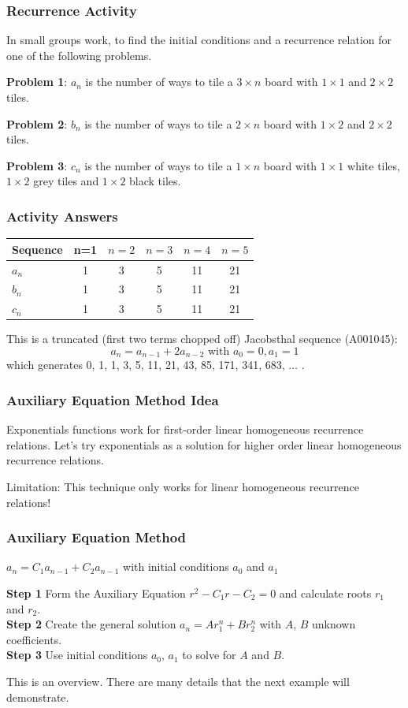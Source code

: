 \documentclass{beamer}
\begin{document}
\frame
{
  \frametitle{Recurrence Activity}

In small groups work, to find the initial conditions and a recurrence relation for one of the following problems.\vfill

{\bf Problem 1}: $a_n$ is the number of ways to tile a $3 \times n$ board with $1 \times 1$ and $ 2\times 2$ tiles. \vfill


{\bf Problem 2}: $b_n$ is the number of ways to tile a $2 \times n$ board with $1 \times 2$ and $ 2\times 2$ tiles.\vfill

{\bf Problem 3}: $c_n$ is the number of ways to tile a $1 \times n$ board with $1 \times 1$  white tiles, $ 1\times 2$ grey tiles and $ 1\times 2$ black tiles.\vfill

}

\frame
{
  \frametitle{ Activity Answers}

\begin{tabular}{lccccc}
Sequence & n=1 & $n=2$ & $n=3$ & $n=4$& $n=5$\\ \hline
$a_n$ & 1& 3& 5& 11& 21  \\
$b_n$ & 1& 3& 5& 11& 21  \\
$c_n$ & 1& 3& 5& 11& 21  \\
\end{tabular}
\vfill
This is a truncated (first two terms chopped off) Jacobsthal sequence (A001045):\\

$$a_n = a_{n-1} + 2a_{n-2} \mbox{ with } a_0 = 0, a_1 = 1$$
which generates 0, 1, 1, 3, 5, 11, 21, 43, 85, 171, 341, 683, $\ldots$ .
}

\frame
{
  \frametitle{ Auxiliary Equation Method Idea}

Exponentials functions work for first-order linear homogeneous recurrence relations.  Let's try exponentials as a solution for higher order linear homogeneous recurrence relations. \vfill

Limitation:  This technique only works for linear homogeneous recurrence relations!

}

\frame
{
  \frametitle{Auxiliary Equation Method }

$a_n=C_1a_{n-1}+C_2a_{n-1}$ with initial conditions $a_0$ and $a_1$\vfill

{\bf Step 1} Form the Auxiliary Equation $r^2-C_1r-C_2=0$ and calculate roots $r_1$ and $r_2$.\\
{\bf Step 2} Create the general solution $a_n=Ar_1^n+Br_2^n$ with $A$, $B$ unknown coefficients.\\
{\bf Step 3} Use initial conditions $a_0$, $a_1$ to solve for $A$ and $B$. \\ \vfill

This is an overview.  There are many details that the next example will demonstrate.

}
\end{document}
